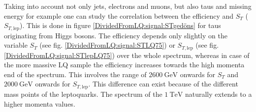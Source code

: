 %
Taking into account not only jets, electrons and muons, but also taus and missing energy for example one can study the correlation between the efficiency and $S_T$ ($S_{T,\text{lep}}$). This is done in figure \ref{DividedFromLQ:signal:STgedöns} for taus originating from Higgs bosons. The efficiency depends only slightly on the variable $S_T$ (see fig. \ref{DividedFromLQ:signal:STLQ75}) or $S_{T,\text{lep}}$ (see fig. \ref{DividedFromLQ:signal:STlepLQ75}) over the whole spectrum, whereas in case of the more massive LQ sample the efficiency increases towards the high momenta end of the spectrum. This involves the range of $\SI{2600}{\giga\electronvolt}$ onwards for $S_T$ and $\SI{2000}{\giga\electronvolt}$ onwards for $S_{T,\text{lep}}$. This difference can exist because of the different mass points of the leptoquarks. The spectrum of the $\SI{1}{\tera\electronvolt}$ naturally extends to a higher momenta values.\newline
%
%
